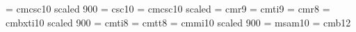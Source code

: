 




\font\smallcaps = cmcsc10 scaled 900
\font\caps = \fontid csc10
\font\boldcaps = cmcsc10 scaled 
\font\rmlyrics = cmr9
\font\itlyrics = cmti9
\font\smallrm = cmr8
\font\itbfsm = cmbxti10 scaled 900
\font\smallit = cmti8
\font\smalltt = cmtt8
\font\smold = cmmi10 scaled 900
\font\amssymbols = msam10
\font\numerical = cmb12




\newcount\hymnno
{}

\def\ngl#1{\cchar{-6}{\itlyrics #1}}
\def\engl#1{\cchar{-7}{\itlyrics #1}}
\def\sengl#1{\cchar{-9}{\itlyrics #1}}
\def\subengl#1{\cchar{-13}{\itlyrics #1}}

\def\tocsectionentry#1#2{\smallskip\goodbreak\line{{\bf #1}\dotfill {\oldstyle #2}\quad}}

\def\tocsubsectionentry#1#2{\line{\qquad \smallrm #1 \hfil}}

\def\beginpart #1\par{}



\def\beginhymn #1.{\line{\numerical\the\hymnno . \hfil \bigtype \idx{#1} \hfil }\advance\hymnno by 1\par\bigskip}

\def\endhymn{\vfill\eject}

\def\mycr{\par\vskip-\parskip}

\def\beginlyrics{\begingroup
                       \def\\{\mycr}
                       \pretolerance=10000
                       \raggedright
                       \parskip=5pt
                       \parindent-3mm}
\def\endlyrics{\endgroup}

